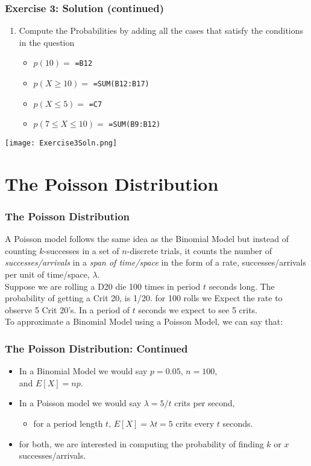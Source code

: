 \documentclass[12pt]{beamer}
\begin{document}
	\begin{frame}
		\frametitle{Exercise 3: Solution (continued)}
		\begin{enumerate}
			\item Compute the Probabilities by adding all the cases that satisfy the conditions in the question
			\begin{itemize}
				\item $p(10) = $ \texttt{=B12}
				\item $p(X \geq 10) =$ \texttt{=SUM(B12:B17)}
				\item $p(X \leq 5)= $ \texttt{=C7}
				\item $p(7\leq X\leq 10)=$ \texttt{=SUM(B9:B12)}
			\end{itemize}
		\end{enumerate}
	\begin{center}
		\texttt{[image: Exercise3Soln.png]}
	\end{center}
	\end{frame}
 \section{The Poisson Distribution}
	\begin{frame}
		\frametitle{The Poisson Distribution}
		A Poisson model follows the same idea as the Binomial Model but instead of counting $k$-successes in a set of $n$-discrete trials, it counts the number of \textit{successes/arrivals} in a \textit{span of time/space} in the form of a rate, successes/arrivals per unit of time/space, $\lambda$. \\
		Suppose we are rolling a D20 die 100 times in  period $t$ seconds long. The probability of getting a Crit 20, is 1/20. for 100 rolls we Expect the rate to observe 5 Crit 20's. In a period of $t$ seconds we expect to see 5 crits.\\
		To approximate a Binomial Model using a Poisson Model, we can say that:
	\end{frame}
	\begin{frame}
		\frametitle{The Poisson Distribution: Continued}
		\begin{itemize}
			\item In a Binomial Model we would say $p = 0.05$, $n=100$, \\and $E[X] = np$. 
			\item In a Poisson model we would say $\lambda =  5/t$ crits per second, 
			\begin{itemize}
				\item for a period length $t$,  $E[X] = \lambda t = 5$ crits every $t$ seconds.
			\end{itemize}
			\item for both, we are interested in computing the probability of finding $k$ or $x$ successes/arrivals. 
		\end{itemize}
	\end{frame}
\end{document}
